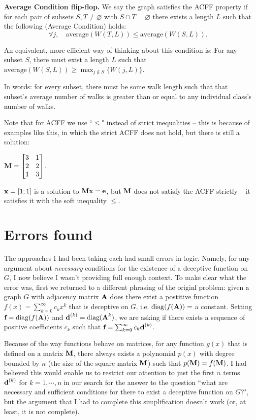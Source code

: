 \textbf{Average Condition flip-flop.}
We say the graph satisfies the ACFF property if for each pair of subsets $S, T \neq \varnothing$ with $S \cap T = \varnothing$
there exists a length $L$ such that the following (Average Condition) holds:
\begin{equation}\label{eqn:average-condition}
  \forall j , \quad \text{average}( W(T,L) ) \leq \text{average}( W(S,L) ).
\end{equation}

An equivalent, more efficient way of thinking about this condition is:
For any subset $S$, there must exist a length $L$ such that $\text{average}( W(S,L) ) \geq \displaystyle\max_{j \notin S} \{  W(j,L)  \}$.

In words: for every subset, there must be some walk length such that that subset's average number of walks is greater than or equal to any individual class's number of walks.

Note that for ACFF we use ``$\leq$" instead of strict inequalities -- this is because of examples like this, in which the strict ACFF does not hold, but there is still a solution:

$\textbf{M} = \begin{bmatrix}  3 & 1\\ 2 & 2 \\ 1 & 3 \end{bmatrix}$.

$\textbf{x} = [1; 1]$ is a solution to $\textbf{M}\textbf{x} = \textbf{e}$, but $\textbf{M}$ does not satisfy the ACFF strictly -- it satisfies it with the soft inequality $\leq$.


\section{Errors found}

The approaches I had been taking each had small errors in logic. Namely, for any argument about \emph{necessary} conditions for the existence of a deceptive function on $G$, I now believe I wasn't providing full enough context. To make clear what the error was, first we returned to a different phrasing of the originl problem:
given a graph $G$ with adjacency matrix $\textbf{A}$ does there exist a postitive function $f(x) = \sum_{k=0}^{\infty} c_k x^k$ that is deceptive on $G$, i.e. $\operatorname{diag}( f(\textbf{A}) )  = $ a constant. Setting $\textbf{f} = \operatorname{diag}(f(\textbf{A}))$ and $\textbf{d}^{(k)} = \operatorname{diag}( \textbf{A}^k )$, we are asking if there exists a sequence of positive coefficients $c_k$ such that $\textbf{f} = \sum_{k=0}^{\infty} c_k \textbf{d}^{(k)}$.

Because of the way functions behave on matrices, for any function $g(x)$ that is defined on a matrix $\textbf{M}$, there always exists a polynomial $p(x)$ with degree bounded by $n$ (the size of the square matrix $\textbf{M}$) such that $p(\textbf{M}) = f(\textbf{M})$. I had believed this would enable us to restrict our attention to just the first $n$ terms $\textbf{d}^{(k)}$ for $k=1,\cdots, n$ in our search for the answer to the question ``what are necessary and sufficient conditions for there to exist a deceptive function on $G$?", but the argument that I had to complete this simplification doesn't work (or, at least, it is not complete).

